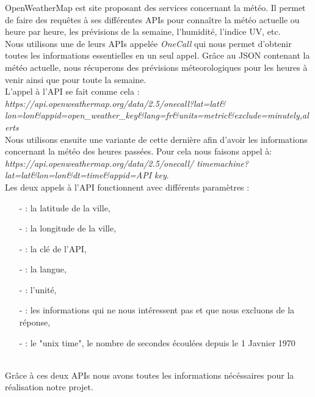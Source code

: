 \documentclass[12pt, french]{article}
\begin{document}
        	OpenWeatherMap est site proposant des services concernant la météo. Il permet
			de faire des requêtes à ses différentes APIs pour connaître la météo actuelle
			ou heure par heure, les prévisions de la semaine, l'humidité, l'indice UV, etc.\\
			Nous utilisons une de leurs APIs appelée \textit{OneCall} 
			qui nous permet d'obtenir toutes les informations essentielles en un seul appel.
			Grâce au JSON contenant la météo actuelle, nous récuperons des prévisions méteorologiques pour
			les heures à venir ainsi que pour toute la semaine.\newline~~\\
			L'appel à l'API se fait comme cela : \\
			\textit{https://api.openweathermap.org/data/2.5/onecall?lat={lat}\& \\
			lon={lon}\&appid={open\_weather\_key}\&lang=fr\&units=metric\&exclude=minutely,alerts}\newline~~\\
			Nous utilisons ensuite une variante de cette dernière afin d'avoir les informations
			concernant la météo des heures passées.\newline
			Pour cela nous faisons appel à:\\ 
			\textit{https://api.openweathermap.org/data/2.5/onecall/
			timemachine?lat={lat}\&lon={lon}\&dt={time}\&appid={API key}}.\newline\\
			Les deux appels à l'API fonctionnent avec différents paramètres :
			\begin{itemize}
			    \item[-]{: la latitude de la ville,}
			    \item[-]{: la longitude de la ville,}
			    \item[-]{: la clé de l'API,}
			    \item[-]{: la langue,}
			    \item[-]{: l'unité,}
			    \item[-]{: les informations qui ne nous intéressent pas et que nous excluons de la réponse,}
			    \item[-]{: le "unix time", le nombre de secondes écoulées depuis le 1 Javnier 1970}
			\end{itemize}~~\\
			Grâce à ces deux APIs nous avons toutes les informations nécéssaires pour la réalisation notre projet.\newline
			
\end{document}
